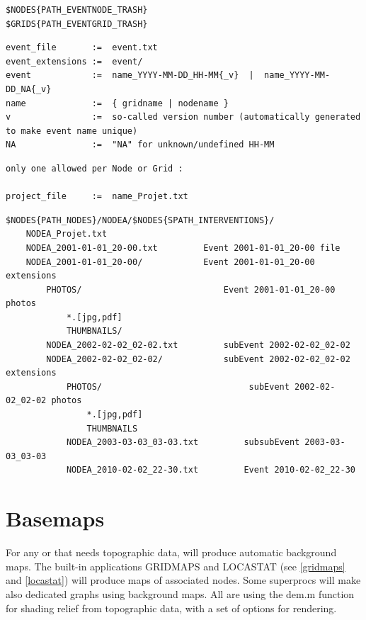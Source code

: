 \begin{lstlisting}[title=Events 'trash' directories (for deleted events)]
$NODES{PATH_EVENTNODE_TRASH}
$GRIDS{PATH_EVENTGRID_TRASH}
\end{lstlisting}

\begin{lstlisting}[title=Events files and extensions naming conventions]
event_file       :=  event.txt
event_extensions :=  event/
event            :=  name_YYYY-MM-DD_HH-MM{_v}  |  name_YYYY-MM-DD_NA{_v}  
name             :=  { gridname | nodename }
v                :=  so-called version number (automatically generated to make event name unique)
NA               :=  "NA" for unknown/undefined HH-MM
\end{lstlisting}

\begin{lstlisting}[title=Special event file: the Project]
only one allowed per Node or Grid :

project_file     :=  name_Projet.txt
\end{lstlisting}

\begin{lstlisting}[title=Unfolded example for node NODEA INTERVENTIONS]
$NODES{PATH_NODES}/NODEA/$NODES{SPATH_INTERVENTIONS}/
	NODEA_Projet.txt
	NODEA_2001-01-01_20-00.txt         Event 2001-01-01_20-00 file
	NODEA_2001-01-01_20-00/            Event 2001-01-01_20-00 extensions
		PHOTOS/                            Event 2001-01-01_20-00 photos 
			*.[jpg,pdf]                         
			THUMBNAILS/                         
		NODEA_2002-02-02_02-02.txt         subEvent 2002-02-02_02-02
		NODEA_2002-02-02_02-02/            subEvent 2002-02-02_02-02 extensions
			PHOTOS/                             subEvent 2002-02-02_02-02 photos
				*.[jpg,pdf]                         
				THUMBNAILS                          
			NODEA_2003-03-03_03-03.txt         subsubEvent 2003-03-03_03-03
			NODEA_2010-02-02_22-30.txt         Event 2010-02-02_22-30
\end{lstlisting}


\section{Basemaps}
\label{basemaps}

For any  or  that needs topographic data, \webobs will produce automatic background maps. The built-in applications GRIDMAPS and LOCASTAT (see \ref{gridmaps} and \ref{locastat}) will produce maps of associated nodes. Some superprocs will make also dedicated graphs using background maps. All are using the dem.m function for shading relief from topographic data, with a set of options for rendering.

